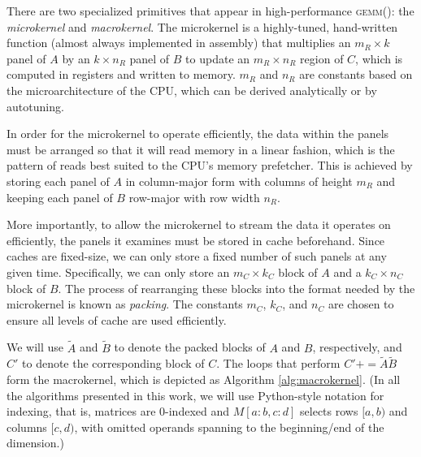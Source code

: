 \documentclass[12pt]{article}
\newcommand*{\TO}{\textbf{to}}
\newcommand*{\pluseq}{\mathrel{{+}{=}}}
\newcommand*{\gemm}{{\textsc{gemm()}}}
\begin{document}
There are two specialized primitives that appear in high-performance \gemm{}: the \emph{microkernel} and \emph{macrokernel}.
The microkernel is a highly-tuned, hand-written function (almost always implemented in assembly) that multiplies an $m_R \times k$ panel of $A$ by an $k \times n_R$ panel of $B$ to update an $m_R \times n_R$ region of $C$, which is computed in registers and written to memory.
$m_R$ and $n_R$ are constants based on the microarchitecture of the CPU, which can be derived analytically\cite{Low2016} or by autotuning\cite{Whaley1998}.

In order for the microkernel to operate efficiently, the data within the panels must be arranged so that it will read memory in a linear fashion, which is the pattern of reads best suited to the CPU's memory prefetcher.
This is achieved by storing each panel of $A$ in column-major form with columns of height $m_R$ and keeping each panel of $B$ row-major with row width $n_R$.

More importantly, to allow the microkernel to stream the data it operates on efficiently, the panels it examines must be stored in cache beforehand.
Since caches are fixed-size, we can only store a fixed number of such panels at any given time.
Specifically, we can only store an $m_C \times k_C$ block of $A$ and a $k_C \times n_C$ block of $B$.
The process of rearranging these blocks into the format needed by the microkernel is known as \emph{packing}.
The constants $m_C$, $k_C$, and $n_C$ are chosen to ensure all levels of cache are used efficiently.

We will use $\tilde{A}$ and $\tilde{B}$ to denote the packed blocks of $A$ and $B$, respectively, and $C'$ to denote the corresponding block of $C$.
The loops that perform $C' \pluseq \tilde{A}\tilde{B}$ form the macrokernel, which is depicted as Algorithm \ref{alg:macrokernel}.
(In all the algorithms presented in this work, we will use Python-style notation for indexing, that is, matrices are 0-indexed and   $M[a:b, c:d]$ selects rows $[a, b)$ and columns $[c, d)$, with omitted operands spanning to the beginning/end of the dimension.)

\begin{algorithm}
  \caption{The macrokernel of a high-performance \gemm{} implementation}
  \label{alg:macrokernel}
  \begin{tikzpicture}
    
  \end{tikzpicture}
  \begin{algorithmic}
    \For{$j \gets 0, n_R, \ldots$ \TO{} $n_C$}
    \For{$i \gets 0, m_R, \ldots$ \TO{} $m_C$}
    \State{$C'[i:i + m_R, j:j + n_R] \pluseq \tilde{A}[i:i+m_R,:] \cdot \tilde{B}[:,j:j+n_R]$}
    \EndFor{}
    \EndFor{}
    \EndProcedure{}
  \end{algorithmic}
\end{algorithm}
\end{document}
